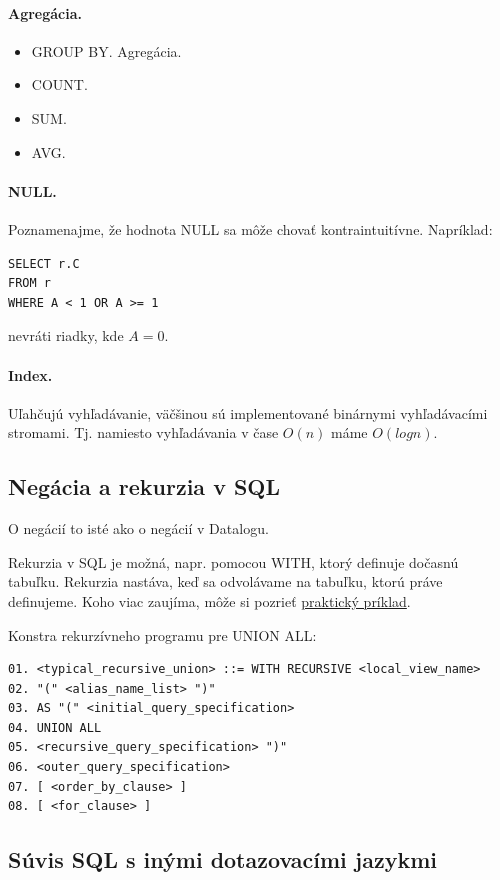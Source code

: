 \documentclass[10pt,a4paper]{article}
\begin{document}
\paragraph{Agregácia.}
\begin{itemize}
\item GROUP BY. Agregácia.  
\item COUNT.
\item SUM.
\item AVG. 
\end{itemize}

\paragraph{NULL.}
Poznamenajme, že hodnota NULL sa môže chovať kontraintuitívne. 
Napríklad: 
\begin{verbatim}
SELECT r.C
FROM r
WHERE A < 1 OR A >= 1
\end{verbatim} 
nevráti riadky, kde $A=0$. 

\paragraph{Index.}
Uľahčujú vyhľadávanie, väčšinou sú implementované binárnymi vyhľadávacími stromami.
Tj. namiesto vyhľadávania v čase $O(n)$ máme $O(logn)$.

\subsection{Negácia a rekurzia v SQL}

O negácií to isté ako o negácií v Datalogu. 

Rekurzia v SQL je možná, napr. pomocou WITH, ktorý definuje dočasnú tabuľku. Rekurzia nastáva, keď sa odvolávame na tabuľku, ktorú práve definujeme. Koho viac zaujíma, môže si pozrieť \href{http://sqlanywhere.blogspot.sk/2012/04/example-recursive-union.html}{praktický príklad}. 

Konstra rekurzívneho programu pre UNION ALL: 
\begin{verbatim}
01. <typical_recursive_union> ::= WITH RECURSIVE <local_view_name>
02. "(" <alias_name_list> ")"
03. AS "(" <initial_query_specification>
04. UNION ALL
05. <recursive_query_specification> ")"
06. <outer_query_specification>
07. [ <order_by_clause> ]
08. [ <for_clause> ]
\end{verbatim} 

\subsection{Súvis SQL s inými dotazovacími jazykmi}
\end{document}
